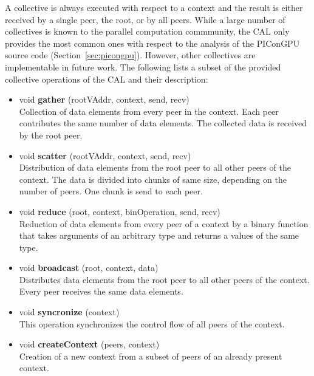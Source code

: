 A collective is always executed with respect to a context and the
result is either received by a single peer, the root, or by all peers.
While a large number of collectives is known to the parallel
computation commmunity, the CAL only provides the most common ones
with respect to the analysis of the PIConGPU source code
(Section~\ref{sec:picongpu}).  However, other collectives are
implementable in future work. The following lists a subset of the
provided collective operations of the CAL and their description:


\begin{itemize}
\item  void \textbf{gather} (rootVAddr, context, send, recv)\\
  Collection of data elements from every peer in the context. Each
  peer contributes the same number of data elements. The collected
  data is received by the root peer.


\item  void \textbf{scatter} (rootVAddr, context, send, recv)\\
  Distribution of data elements from the root peer to all other peers of
  the context. The data is divided into chunks of same
  size, depending on the number of peers. One chunk is send to each peer.


\item  void \textbf{reduce} (root, context, binOperation, send, recv)\\
  Reduction of data elements from every peer of a context
  by a binary function that takes arguments of an arbitrary type
  and returns a values of the same type.


\item  void \textbf{broadcast} (root, context, data)\\
  Distributes data elements from the root peer to all other peers of
  the context. Every peer receives the same data elements.

\item  void \textbf{syncronize} (context)\\
  This operation synchronizes the control flow of all peers of the
  context.

\item  void \textbf{createContext} (peers, context)\\ 
  Creation of a new context from a subset of peers of an already
  present context.

\end{itemize}

